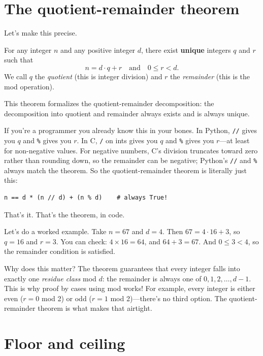 \documentclass[11pt]{article}
\begin{document}
\section{The quotient-remainder theorem}

Let's make this precise.

\begin{theorem}
For any integer $n$ and any positive integer $d$, there exist \textbf{unique} integers $q$ and $r$ such that
\[
  n = d \cdot q + r \quad \text{and} \quad 0 \le r < d.
\]
We call $q$ the \emph{quotient} (this is integer division) and $r$ the \emph{remainder} (this is the mod operation).
\end{theorem}

This theorem formalizes the quotient-remainder decomposition: the decomposition into quotient and remainder always exists and is always unique.

If you're a programmer you already know this in your bones. In Python, \texttt{//} gives you $q$ and \texttt{\%} gives you $r$. In C, \texttt{/} on ints gives you $q$ and \texttt{\%} gives you $r$---at least for non-negative values. For negative numbers, C's division truncates toward zero rather than rounding down, so the remainder can be negative; Python's \texttt{//} and \texttt{\%} always match the theorem. So the quotient-remainder theorem is literally just this:
\begin{lstlisting}
n == d * (n // d) + (n % d)    # always True!
\end{lstlisting}
That's it. That's the theorem, in code.

Let's do a worked example. Take $n = 67$ and $d = 4$. Then $67 = 4 \cdot 16 + 3$, so $q = 16$ and $r = 3$. You can check: $4 \times 16 = 64$, and $64 + 3 = 67$. And $0 \le 3 < 4$, so the remainder condition is satisfied.

Why does this matter? The theorem guarantees that every integer falls into exactly one \emph{residue class} mod $d$: the remainder is always one of $0, 1, 2, \ldots, d-1$. This is why proof by cases using mod works! For example, every integer is either even ($r = 0$ mod 2) or odd ($r = 1$ mod 2)---there's no third option. The quotient-remainder theorem is what makes that airtight.

\section{Floor and ceiling}
\end{document}
